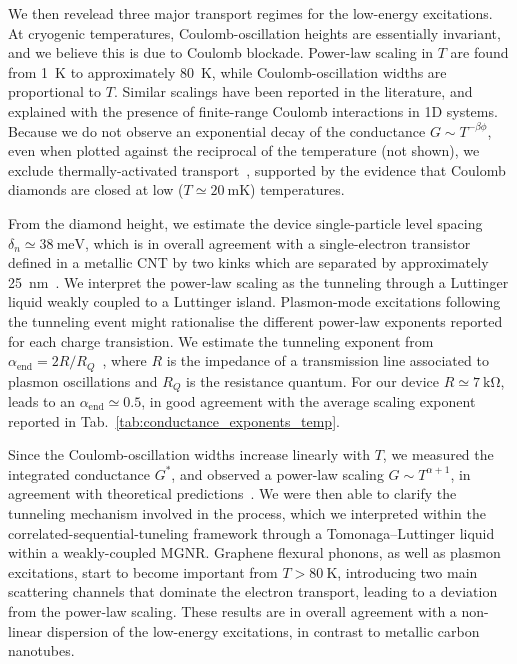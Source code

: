 We then revelead three major transport regimes for the low-energy excitations. At cryogenic temperatures, Coulomb-oscillation heights are essentially invariant, and we believe this is due to Coulomb blockade. Power-law scaling in $T$ are found from \SI{1}{\kelvin} to approximately \SI{80}{\kelvin}, while Coulomb-oscillation widths are proportional to $T$. Similar scalings have been reported in the literature, and explained with the presence of finite-range Coulomb interactions in 1D systems. Because we do not observe an exponential decay of the conductance $G\sim T^{-\beta\phi}$, even when plotted against the reciprocal of the temperature (not shown), we exclude thermally-activated transport~\cite{sols2007coulomb}, supported by the evidence that Coulomb diamonds are closed at low ($T\simeq\SI{20}{\milli\kelvin}$) temperatures.

From the diamond height, we estimate the device single-particle level spacing $\delta_n\simeq\SI{38}{\milli\electronvolt}$, which is in overall agreement with a single-electron transistor defined in a metallic \gls{CNT} by two kinks which are separated by approximately \SI{25}{\nano\metre}~\cite{Postma2001}. We interpret the power-law scaling as the tunneling through a Luttinger liquid weakly coupled to a Luttinger island. Plasmon-mode excitations following the tunneling event might rationalise the different power-law exponents reported for each charge transistion. We estimate the tunneling exponent from $\alpha_\textrm{end}=2R/R_Q$~\cite{bachtold2001suppression}, where $R$ is the impedance of a transmission line associated to plasmon oscillations and $R_Q$ is the resistance quantum. For our device $R\simeq\SI{7}{\kilo\ohm}$, leads to an $\alpha_\textrm{end}\simeq0.5$, in good agreement with the average scaling exponent reported in Tab.~\ref{tab:conductance_exponents_temp}.

Since the Coulomb-oscillation widths increase linearly with $T$, we measured the integrated conductance $G^*$, and observed a power-law scaling $G\sim T^{\alpha+1}$, in agreement with theoretical predictions~\cite{thorwart2002correlated}. We were then able to clarify the tunneling mechanism involved in the process, which we interpreted within the correlated-sequential-tuneling framework through a Tomonaga--Luttinger liquid within a weakly-coupled \gls{MGNR}. Graphene flexural phonons, as well as plasmon excitations, start to become important from $T>\SI{80}{\kelvin}$, introducing two main scattering channels that dominate the electron transport, leading to a deviation from the power-law scaling. These results are in overall agreement with a non-linear dispersion of the low-energy excitations, in contrast to metallic carbon nanotubes.


